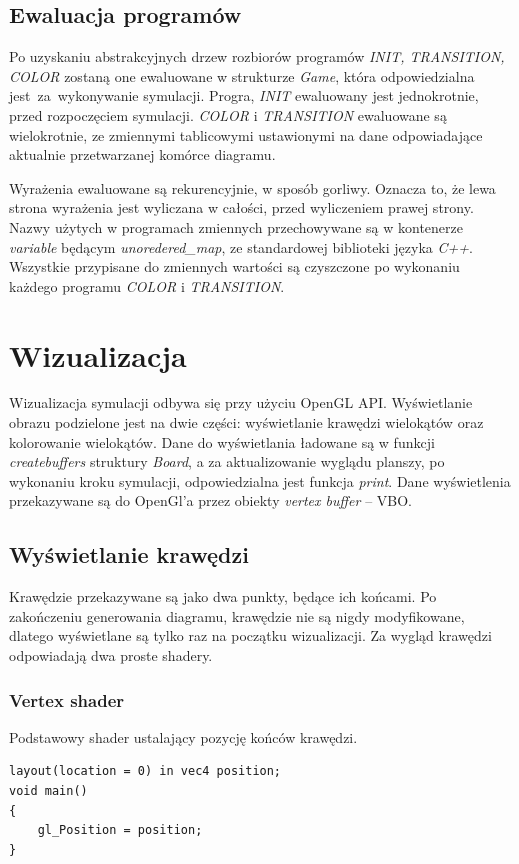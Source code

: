 \documentclass[declaration,shortabstract, inz]{iithesis}
\theoremstyle{definition} \newtheorem{definition}{Definicja}[]
\theoremstyle{plain} \newtheorem{remark}[definition]{Obserwacja}
\theoremstyle{plain} \newtheorem{theorem}[definition]{Twierdzenie}
\theoremstyle{plain} \newtheorem{example}{Przykład}[definition]
\theoremstyle{plain} \newtheorem{lemma}[definition]{Lemat}
\begin{document}
\section{Ewaluacja programów}
Po uzyskaniu abstrakcyjnych drzew rozbiorów programów \textit{INIT, TRANSITION, COLOR} zostaną one ewaluowane w strukturze \textit{Game}, która odpowiedzialna jest~za~wykonywanie symulacji. Progra, \textit{INIT} ewaluowany jest jednokrotnie, przed rozpoczęciem symulacji. \textit{COLOR} i \textit{TRANSITION} ewaluowane są wielokrotnie, ze zmiennymi tablicowymi ustawionymi na dane odpowiadające aktualnie przetwarzanej komórce diagramu. 

Wyrażenia ewaluowane są rekurencyjnie, w sposób gorliwy. Oznacza to, że lewa strona wyrażenia jest wyliczana w całości, przed wyliczeniem prawej strony. Nazwy użytych w programach zmiennych przechowywane są w kontenerze \textit{variable} będącym \textit{unoredered\_map}, ze standardowej biblioteki języka \textit{C++}. Wszystkie przypisane do zmiennych wartości są czyszczone po wykonaniu każdego programu \textit{COLOR} i \textit{TRANSITION}.

\chapter{Wizualizacja}

Wizualizacja symulacji odbywa się przy użyciu OpenGL API. Wyświetlanie obrazu podzielone jest na dwie części: wyświetlanie krawędzi wielokątów oraz kolorowanie wielokątów. Dane do wyświetlania ładowane są w funkcji \textit{createbuffers} struktury \textit{Board}, a za aktualizowanie wyglądu planszy, po wykonaniu kroku symulacji, odpowiedzialna  jest funkcja \textit{print}. Dane wyświetlenia przekazywane są do OpenGl'a przez obiekty \textit{vertex buffer} -- VBO.

\section{Wyświetlanie krawędzi}

Krawędzie przekazywane są jako dwa punkty, będące ich końcami. Po zakończeniu generowania diagramu, krawędzie nie są nigdy modyfikowane, dlatego wyświetlane są tylko raz na początku wizualizacji. Za wygląd krawędzi odpowiadają dwa proste shadery. 

\subsection{Vertex shader}
Podstawowy shader ustalający pozycję końców krawędzi.
\begin{center}
\begin{lstlisting}
layout(location = 0) in vec4 position;
void main()
{
	gl_Position = position;
}
\end{lstlisting}
\end{center}
\end{document}
